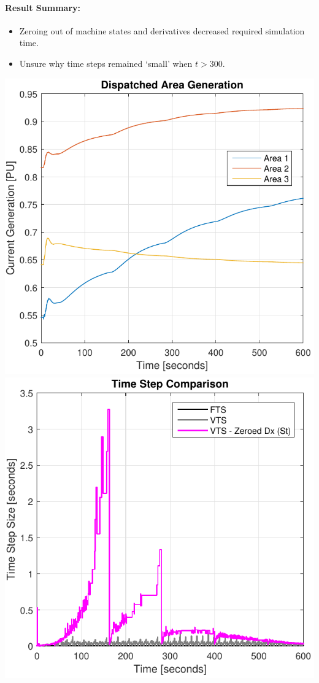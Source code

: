 \documentclass[12pt]{article}
\begin{document}
\paragraph{Result Summary:}
\begin{itemize}
\item Zeroing out of machine states and derivatives decreased required simulation time.
\item Unsure why time steps remained `small' when $t>300$.
\end{itemize}

\begin{center}
\includegraphics[width=.45\linewidth]{AGCdisp}%
\includegraphics[width=.45\linewidth]{tripStepSz}%
\end{center}
\end{document}
